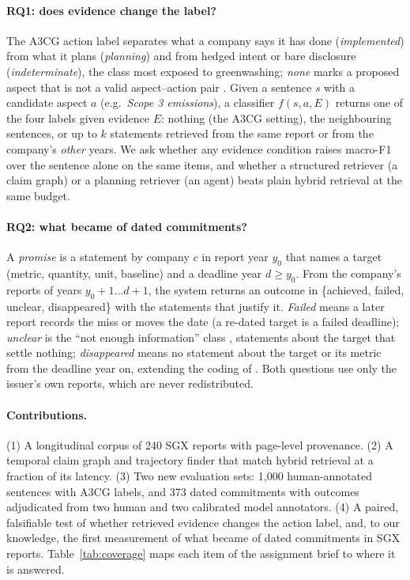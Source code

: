 \documentclass[11pt]{article}
\begin{document}
\paragraph{RQ1: does evidence change the label?}
The A3CG action label separates what a company says it has done (\emph{implemented}) from what it plans (\emph{planning}) and from hedged intent or bare disclosure (\emph{indeterminate}), the class most exposed to greenwashing; \emph{none} marks a proposed aspect that is not a valid aspect--action pair \citep{ong-etal-2025-a3cg}. Given a sentence $s$ with a candidate aspect $a$ (e.g.\ \emph{Scope 3 emissions}), a classifier $f(s, a, E)$ returns one of the four labels given evidence $E$: nothing (the A3CG setting), the neighbouring sentences, or up to $k$ statements retrieved from the same report or from the company's \emph{other} years. We ask whether any evidence condition raises macro-F1 over the sentence alone on the same items, and whether a structured retriever (a claim graph) or a planning retriever (an agent) beats plain hybrid retrieval at the same budget.

\paragraph{RQ2: what became of dated commitments?}
A \emph{promise} is a statement by company $c$ in report year $y_0$ that names a target (metric, quantity, unit, baseline) and a deadline year $d \ge y_0$. From the company's reports of years $y_0{+}1 \ldots d{+}1$, the system returns an outcome in \{achieved, failed, unclear, disappeared\} with the statements that justify it. \emph{Failed} means a later report records the miss or moves the date (a re-dated target is a failed deadline); \emph{unclear} is the ``not enough information'' class \citep{thorne-etal-2018-fever}, statements about the target that settle nothing; \emph{disappeared} means no statement about the target or its metric from the deadline year on, extending the coding of \citet{jiang2025targets}. Both questions use only the issuer's own reports, which are never redistributed.

\paragraph{Contributions.}
(1) A longitudinal corpus of 240 SGX reports with page-level provenance. (2) A temporal claim graph and trajectory finder that match hybrid retrieval at a fraction of its latency. (3) Two new evaluation sets: 1,000 human-annotated sentences with A3CG labels, and 373 dated commitments with outcomes adjudicated from two human and two calibrated model annotators. (4) A paired, falsifiable test of whether retrieved evidence changes the action label, and, to our knowledge, the first measurement of what became of dated commitments in SGX reports. Table~\ref{tab:coverage} maps each item of the assignment brief to where it is answered.
\end{document}
